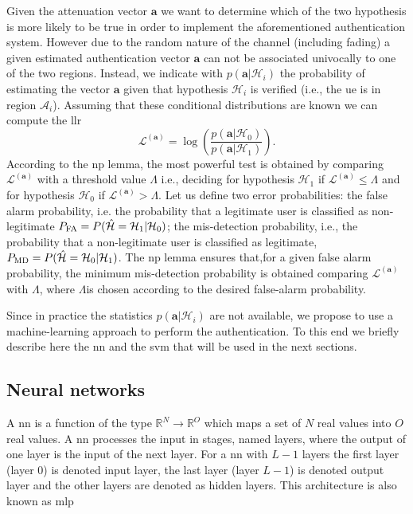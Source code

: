 \documentclass[draftcls,onecolumn,12pt]{IEEEtran}
\begin{document}
Given the attenuation vector $\bm{a}$ we want to determine which of the two hypothesis is more likely to be true in order to implement the aforementioned authentication system. However due to the random nature of the channel (including fading) a given estimated authentication vector $\bm{a}$ can not be associated univocally to one of the two regions. Instead, we indicate with $p(\bm{a}|\mathcal{H}_i)$ the probability of estimating the vector $\bm{a}$ given that hypothesis $\mathcal{H}_i$ is verified (i.e., the \ac{ue} is in region $\mathcal{A}_i$).
Assuming that these conditional distributions are known we can compute the \ac{llr}
\begin{equation}\label{eq:lr}
    \mathcal{L}^{(\bm{a})}=\log\left(\frac{p(\bm{a}|\mathcal{H}_0)}{p(\bm{a}|\mathcal{H}_1)}\right).
\end{equation}
According to the \ac{np} lemma, the most powerful test is obtained by comparing $\mathcal{L}^{(\bm{a})}$ with a threshold value $\Lambda$ i.e., deciding for hypothesis $\mathcal{H}_1$ if $\mathcal{L}^{(\bm{a})} \le \Lambda$ and for hypothesis $\mathcal{H}_0$ if $\mathcal{L}^{(\bm{a})} > \Lambda$. Let us define two error probabilities: the false alarm probability, i.e. the probability  that a legitimate user is classified as non-legitimate $P_{\rm FA} =P(\hat{\mathcal H} = \mathcal H_1 | \mathcal H_0)$; the mis-detection probability, i.e., the probability that a non-legitimate user is classified as legitimate, $P_{\rm MD}=P(\hat{\mathcal H} = \mathcal H_0 | \mathcal H_1)$. The \ac{np} lemma ensures that,for a given false alarm probability, the minimum mis-detection probability is obtained comparing $\mathcal{L}^{(\bm{a})}$ with $\Lambda$, where $\Lambda$is chosen according to the desired false-alarm probability.

Since in practice the statistics $p(\bm{a}|\mathcal{H}_i)$ are not available, we propose to use a machine-learning approach to perform the authentication. To this end we briefly describe here the \ac{nn} and the \ac{svm} that will be used in the next sections.

\subsection{Neural networks}\label{sec:nn}

A \ac{nn} is a function of the type $\mathbb{R}^N \to \mathbb{R}^O$ which maps a set of $N$ real values into $O$ real values. A \ac{nn} processes the input in stages, named layers, where the output of one layer is the input of the next layer. For a \ac{nn} with $L-1$ layers the first layer (layer $0$) is denoted input layer, the last layer (layer $L-1$) is denoted output layer and the other layers are denoted as hidden layers. This architecture is also known as \ac{mlp}
\end{document}
